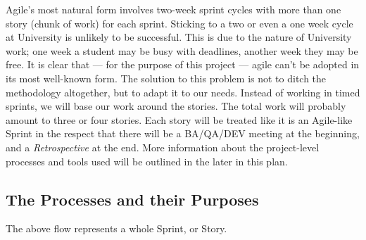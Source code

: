 \documentclass[12pt]{article}
\begin{document}
Agile's most natural form involves two-week sprint cycles with more than one story (chunk of work) for each sprint. Sticking to a two or even a one week cycle at University is unlikely to be successful. This is due to the nature of University work; one week a student may be busy with deadlines, another week they may be free. It is clear that --- for the purpose of this project --- agile can't be adopted in its most well-known form. The solution to this problem is not to ditch the methodology altogether, but to adapt it to our needs. Instead of working in timed sprints, we will base our work around the stories. The total work will probably amount to three or four stories. Each story will be treated like it is an Agile-like Sprint in the respect that there will be a BA/QA/DEV meeting at the beginning, and a \emph{Retrospective} at the end. More information about the project-level processes and tools used will be outlined in the later in this plan.

\newpage

 \subsection{The Processes and their Purposes}
 \vspace{0.3cm}
\noindent{}

The above flow represents a whole Sprint, or Story. 
\end{document}
